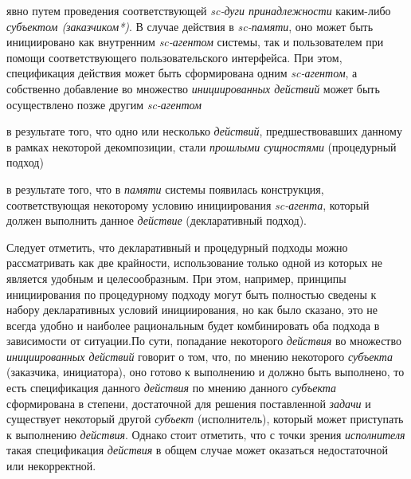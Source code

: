 \begin{SCn}
\begin{scnsubstruct}
\begin{scneqtoset}
{{                    \begin{scnitemize}
                        \item явно путем проведения соответствующей \textit{sc-дуги  принадлежности} каким-либо \textit{субъектом (заказчиком*)}. В случае действия в \textit{sc-памяти}, оно может быть инициировано как внутренним \textit{sc-агентом} системы, так и пользователем при помощи соответствующего пользовательского интерфейса. При этом, спецификация действия может быть сформирована одним \textit{sc-агентом}, а собственно добавление во множество \textit{инициированных действий} может быть осуществлено позже другим \textit{sc-агентом}
                        \item в результате того, что одно или несколько \textit{действий}, предшествовавших данному в рамках некоторой декомпозиции, стали \textit{прошлыми сущностями} (процедурный подход)
                        \item в результате того, что в \textit{памяти} системы появилась конструкция, соответствующая некоторому условию инициирования \textit{sc-агента}, который должен выполнить данное \textit{действие} (декларативный подход).
                    \end{scnitemize}
                    Следует отметить, что декларативный и процедурный подходы можно рассматривать как две крайности, использование только одной из которых не является удобным и целесообразным. При этом, например, принципы инициирования по процедурному подходу могут быть полностью сведены к набору декларативных условий инициирования, но как было сказано, это не всегда удобно и наиболее рациональным будет комбинировать оба подхода в зависимости от ситуации.По сути, попадание некоторого \textit{действия} во множество \textit{инициированных действий} говорит о том, что, по мнению некоторого \textit{субъекта} (заказчика, инициатора), оно готово к выполнению и должно быть выполнено, то есть спецификация данного \textit{действия} по мнению данного \textit{субъекта} сформирована в степени, достаточной для решения поставленной \textit{задачи} и существует некоторый другой \textit{субъект} (исполнитель), который может приступать к выполнению \textit{действия}. Однако стоит отметить, что с точки зрения \textit{исполнителя} такая спецификация \textit{действия} в общем случае может оказаться недостаточной или некорректной.}
            }
\end{scneqtoset}
\end{scnsubstruct}
\end{SCn}
